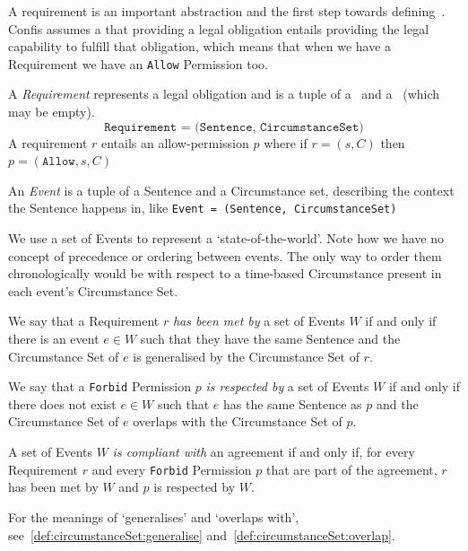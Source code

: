 A requirement is an important abstraction and the first step towards defining~.
Confis assumes a that providing a legal obligation entails providing the legal capability to fulfill that obligation, which means that when we have a Requirement we have an \texttt{Allow} Permission too.

\begin{definition}[Requirement]
    \label{def:requirement} A \emph{Requirement} represents a legal obligation and is a tuple of a~ and a~ (which may be empty).
    \[ \texttt{Requirement = (Sentence, CircumstanceSet)}\]
    A requirement $r$ entails an allow-permission $p$ where if $r = (s, C)$ then $p = (\texttt{Allow}, s, C)$
\end{definition}

\begin{definition}[Event]
    \label{def:event}
    An \emph{Event} is a tuple of a Sentence and a Circumstance set, describing the context the Sentence happens in, like \texttt{Event = (Sentence, CircumstanceSet)}
\end{definition}

We use a set of Events to represent a `state-of-the-world'.
Note how we have no concept of precedence or ordering between events.
The only way to order them chronologically would be with respect to a time-based Circumstance present in each event's Circumstance Set.

\begin{definition}[Compliance]
    \label{def:confis-compliance}
    We say that a Requirement $r$ \emph{has been met by} a set of Events $W$ if and only if there is an event $e \in W$ such that they have the same Sentence and the Circumstance Set of $e$ is generalised by the Circumstance Set of $r$.

    We say that a \texttt{Forbid} Permission $p$ \emph{is respected by} a set of Events $W$ if and only if there does not exist $e \in W$ such that $e$ has the same Sentence as $p$ and the Circumstance Set of $e$ overlaps with the Circumstance Set of $p$.

    A set of Events $W$ \emph{is compliant with} an agreement if and only if, for every Requirement $r$ and every \texttt{Forbid} Permission $p$ that are part of the agreement, $r$ has been met by $W$ and $p$ is respected by $W$.
\end{definition}

For the meanings of `generalises' and `overlaps with', see~\autoref{def:circumstanceSet:generalise} and~\autoref{def:circumstanceSet:overlap}.

